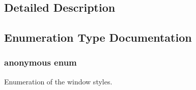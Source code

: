 \subsection{Detailed Description}


\subsection{Enumeration Type Documentation}
\hypertarget{group__window_gae1db07091f9745bd223882ba55e7fae2}{\subsubsection[{anonymous enum}]{\setlength{\rightskip}{0pt plus 5cm}anonymous enum}}\label{group__window_gae1db07091f9745bd223882ba55e7fae2}


Enumeration of the window styles. 

